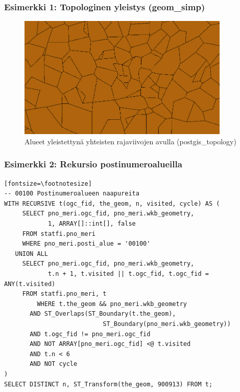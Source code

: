 \documentclass[english,finnish]{beamer}
\begin{document}
\begin{frame}[fragile=singleslide]\frametitle{Esimerkki 1: Topologinen yleistys (geom\_simp)}
\begin{figure}[h]
\begin{center}
\includegraphics[width=0.90\textwidth]{pnro_toposimp500.png}
\caption{Alueet yleistettynä yhteisten rajaviivojen avulla (postgis\_topology)}
\label{kuva3}
\end{center}
\end{figure}
\end{frame}

\begin{frame}[fragile=singleslide]\frametitle{Esimerkki 2: Rekursio postinumeroalueilla}
\begin{verbatim}[fontsize=\footnotesize]
-- 00100 Postinumeroalueen naapureita
WITH RECURSIVE t(ogc_fid, the_geom, n, visited, cycle) AS (
     SELECT pno_meri.ogc_fid, pno_meri.wkb_geometry, 
            1, ARRAY[]::int[], false
     FROM statfi.pno_meri
     WHERE pno_meri.posti_alue = '00100'
   UNION ALL
     SELECT pno_meri.ogc_fid, pno_meri.wkb_geometry, 
            t.n + 1, t.visited || t.ogc_fid, t.ogc_fid = ANY(t.visited)
     FROM statfi.pno_meri, t
         WHERE t.the_geom && pno_meri.wkb_geometry
	   AND ST_Overlaps(ST_Boundary(t.the_geom), 
                           ST_Boundary(pno_meri.wkb_geometry))
	   AND t.ogc_fid != pno_meri.ogc_fid
	   AND NOT ARRAY[pno_meri.ogc_fid] <@ t.visited
	   AND t.n < 6
	   AND NOT cycle
)
SELECT DISTINCT n, ST_Transform(the_geom, 900913) FROM t;
\end{verbatim}
\end{frame}
\end{document}

